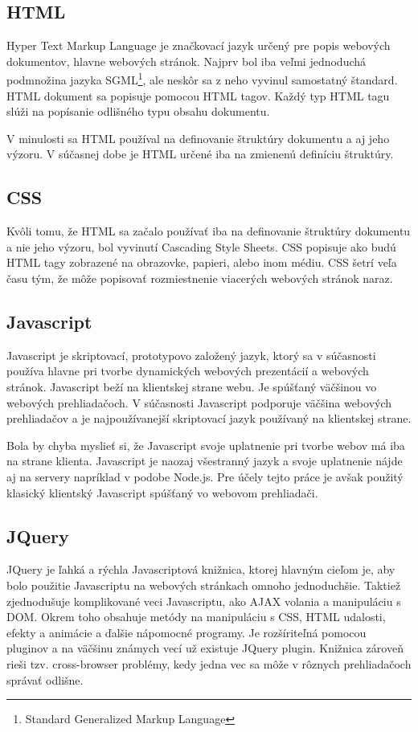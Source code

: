 \subsection{HTML}
\label{sec:html}
Hyper Text Markup Language je značkovací jazyk určený pre popis webových dokumentov, hlavne webových stránok. Najprv bol iba veľmi jednoduchá podmnožina jazyka SGML\footnote{Standard Generalized Markup Language}, ale neskôr sa z neho vyvinul samostatný štandard. HTML dokument sa popisuje pomocou HTML tagov. Každý typ HTML tagu slúži na popísanie odlišného typu obsahu dokumentu.  

V minulosti sa HTML používal na definovanie štruktúry dokumentu a aj jeho výzoru. V súčasnej dobe je HTML určené iba na zmienenú definíciu štruktúry.

\subsection{CSS}
\label{sec:css}
Kvôli tomu, že HTML sa začalo používať iba na definovanie štruktúry dokumentu a nie jeho výzoru, bol vyvinutí Cascading Style Sheets. CSS popisuje ako budú HTML tagy zobrazené na obrazovke, papieri, alebo inom médiu. CSS šetrí veľa času tým, že môže popisovať rozmiestnenie viacerých webových stránok naraz.

\subsection{Javascript}
\label{sec:javascript}
Javascript je skriptovací, prototypovo založený jazyk, ktorý sa v súčasnosti používa hlavne pri tvorbe dynamických webových prezentácií a webových stránok. Javascript beží na klientskej strane webu. Je spúšťaný väčšinou vo webových prehliadačoch. V súčasnosti Javascript podporuje väčšina webových prehliadačov a je najpoužívanejší skriptovací jazyk používaný na klientskej strane.

Bola by chyba myslieť si, že Javascript svoje uplatnenie pri tvorbe webov má iba na strane klienta. Javascript je naozaj všestranný jazyk a svoje uplatnenie nájde aj na servery napríklad v podobe Node.js. Pre účely tejto práce je avšak použitý klasický klientský Javascript spúšťaný vo webovom prehliadači.

\subsection{JQuery}
\label{sec:jquery}
JQuery je ľahká a rýchla Javascriptová knižnica, ktorej hlavným cieľom je, aby bolo použitie Javascriptu na webových stránkach omnoho jednoduchšie. Taktiež zjednodušuje komplikované veci Javascriptu, ako AJAX volania a manipuláciu s DOM. Okrem toho obsahuje metódy na manipuláciu s CSS, HTML udalosti, efekty a animácie a ďalšie nápomocné programy. Je rozšíriteľná pomocou pluginov a na väčšinu známych vecí už existuje JQuery plugin. Knižnica zároveň rieši tzv. cross-browser problémy, kedy jedna vec sa môže v rôznych prehliadačoch správať odlišne.

